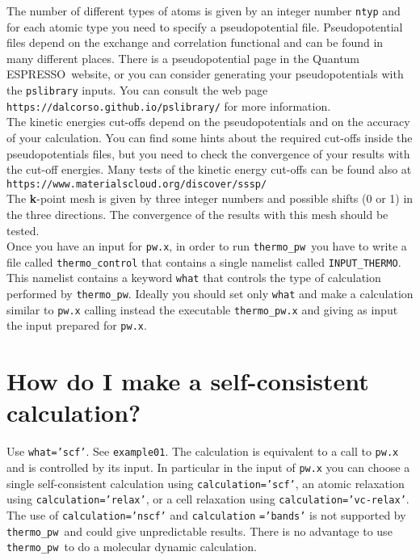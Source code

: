 \documentclass[12pt,a4paper]{article}
\def\qe{{\sc Quantum ESPRESSO}}
\def\thermo{\texttt{thermo\_pw}}
\begin{document}
The number of different types of atoms is given by an integer number 
\texttt{ntyp} and for each atomic type you need to specify a 
pseudopotential file. Pseudopotential files depend on the exchange and 
correlation functional and can be found in many 
different places. There is a pseudopotential page in the \qe\ website, or 
you can consider generating your pseudopotentials with the \texttt{pslibrary} 
inputs. You can consult the web page \texttt{https://dalcorso.github.io/pslibrary/} for more information. \\

The kinetic energies cut-offs depend on the pseudopotentials
and on the accuracy of your calculation. You can 
find some hints about the required cut-offs inside the pseudopotentials files,
but you need to check the convergence of your results with the cut-off 
energies. Many tests of the kinetic energy cut-offs can be found also at 
\texttt{https://www.materialscloud.org/discover/sssp/} \\

The {\bf k}-point mesh is given by three integer numbers and possible
shifts (0 or 1) in the three directions. The convergence of the results
with this mesh should be tested. \\

Once you have an input for \texttt{pw.x}, in order to run \thermo\ you
have to write a file called \texttt{thermo\_control} that contains a single
namelist called \texttt{INPUT\_THERMO}. This namelist contains a keyword
\texttt{what} that controls the type of calculation performed by 
\thermo. Ideally you should set only \texttt{what} and make a calculation
similar to \texttt{pw.x} calling instead the executable \texttt{thermo\_pw.x}
and giving as input the input prepared for \texttt{pw.x}.

\section{\color{coral}How do I make a self-consistent calculation?}
Use \texttt{what='scf'}. See \texttt{example01}. The calculation is
equivalent to a call to \texttt{pw.x} and is controlled by
its input. In particular in the input of \texttt{pw.x} you can choose
a single self-consistent calculation using \texttt{calculation='scf'}, 
an atomic relaxation using \texttt{calculation='relax'}, or a cell relaxation 
using \texttt{calculation='vc-relax'}.
The use of \texttt{calculation='nscf'} and \texttt{calculation}
\texttt{='bands'} is
not supported by \thermo\ and could give unpredictable results.
There is no advantage to use \thermo\ to do a molecular dynamic
calculation. 
\end{document}
